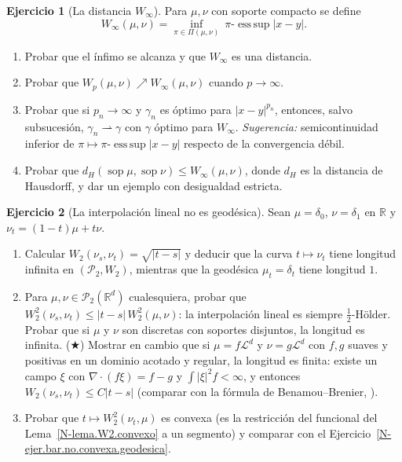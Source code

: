 \documentclass[11pt,a4paper]{amsart}
\newcounter{chapter}
\def\sop{\operatorname {\mathrm{sop}}}
\newcommand{\R}{{\mathbb R}}
\newcommand{\LL}{{\mathcal L}}
\theoremstyle{remark}
\theoremstyle{definition}
\newtheorem{ejercicio}{Ejercicio}[chapter]
\numberwithin{subsection}{section}
\numberwithin{equation}{section}
\begin{document}
\begin{ejercicio}[La distancia $W_\infty$]\label{ejer.Winfty}
Para $\mu,\nu$ con soporte compacto se define
\[
W_\infty(\mu,\nu)=\inf_{\pi\in\Pi(\mu,\nu)}\ \pi\text{-}\operatorname{ess\,sup}|x-y|.
\]
\begin{enumerate}[label=(\alph*)]
\item Probar que el ínfimo se alcanza y que $W_\infty$ es una distancia.
\item Probar que $W_p(\mu,\nu)\nearrow W_\infty(\mu,\nu)$ cuando
$p\to\infty$.
\item Probar que si $p_n\to\infty$ y $\gamma_n$ es óptimo para $|x-y|^{p_n}$,
entonces, salvo subsucesión, $\gamma_n\rightharpoonup\gamma$ con $\gamma$
óptimo para $W_\infty$. \emph{Sugerencia:} semicontinuidad inferior de
$\pi\mapsto\pi$-$\operatorname{ess\,sup}|x-y|$ respecto de la convergencia
débil.
\item Probar que $d_H(\sop\mu,\sop\nu)\le W_\infty(\mu,\nu)$, donde $d_H$ es
la distancia de Hausdorff, y dar un ejemplo con desigualdad estricta.
\end{enumerate}
\end{ejercicio}

\begin{ejercicio}[La interpolación lineal no es geodésica]\label{ejer.Wp.lineal}
Sean $\mu=\delta_0$, $\nu=\delta_1$ en $\R$ y $\nu_t=(1-t)\mu+t\nu$.
\begin{enumerate}[label=(\alph*)]
\item Calcular $W_2(\nu_s,\nu_t)=\sqrt{|t-s|}$ y deducir que la curva
$t\mapsto\nu_t$ tiene longitud infinita en $(\mathcal P_2,W_2)$, mientras que
la geodésica $\mu_t=\delta_t$ tiene longitud $1$.
\item Para $\mu,\nu\in\mathcal P_2(\R^d)$ cualesquiera, probar que
$W_2^2(\nu_s,\nu_t)\le|t-s|\,W_2^2(\mu,\nu)$: la interpolación lineal es
siempre $\frac12$-Hölder. Probar que si $\mu$ y $\nu$ son discretas con
soportes disjuntos, la longitud es infinita. ($\bigstar$) Mostrar en cambio
que si $\mu=f\LL^d$ y $\nu=g\LL^d$ con $f,g$ suaves y positivas en un dominio
acotado y regular, la longitud es finita: existe un campo $\xi$ con
$\nabla\cdot(f\xi)=f-g$ y $\int|\xi|^2f<\infty$, y entonces
$W_2(\nu_s,\nu_t)\le C|t-s|$ (comparar con la fórmula de Benamou--Brenier,
\cite[Sec.~5.4]{Santambrogio}).
\item Probar que $t\mapsto W_2^2(\nu_t,\mu)$ es convexa (es la restricción
del funcional del Lema~\ref{N-lema.W2.convexo} a un segmento) y comparar con
el Ejercicio~\ref{N-ejer.bar.no.convexa.geodesica}.
\end{enumerate}
\end{ejercicio}
\end{document}
